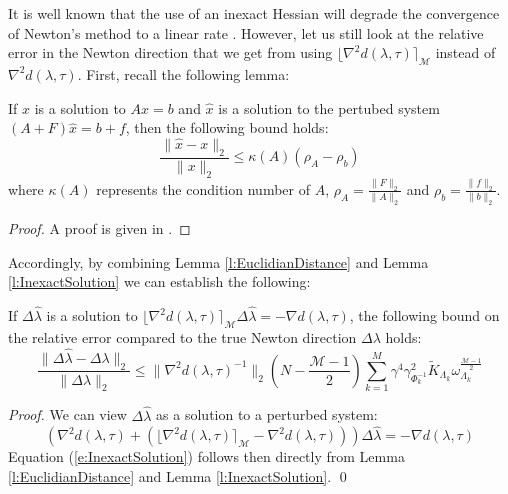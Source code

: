 It is well known that the use of an inexact Hessian will degrade the convergence of Newton's method to a linear rate \cite{}. However, let us still look at the relative error in the Newton direction that we get from using $\lfloor \nabla^2 d(\lambda, \tau) \rceil_{\mathcal{M}}$ instead of $\nabla^2 d(\lambda, \tau)$. First, recall the following lemma:
\begin{lemma} \label{l:InexactSolution}
If $x$ is a solution to $Ax = b$ and $\hat{x}$ is a solution to the pertubed system $(A + F) \hat{x} = b + f$, then the following bound holds:
\begin{equation}
\frac{\| \hat{x} - x \|_2}{\| x \|_2} \leq \kappa (A) (\rho_A - \rho_b)
\end{equation}
where $\kappa (A)$ represents the condition number of $A$, $\rho_A = \frac{\| F \|_2}{\| A \|_2}$ and $\rho_b = \frac{\| f \|_2}{\| b \|_2}$.
\end{lemma}
\begin{proof}
A proof is given in \cite{}.
\end{proof}

Accordingly, by combining Lemma \ref{l:EuclidianDistance} and Lemma \ref{l:InexactSolution} we can establish the following:
\begin{lemma}
If $\Delta \hat{\lambda}$ is a solution to $\lfloor \nabla^2 d(\lambda, \tau) \rceil_{\mathcal{M}} \Delta \hat{\lambda} = -\nabla d(\lambda,\tau)$, the following bound on the relative error compared to the true Newton direction $\Delta \lambda$ holds:
\begin{equation} \label{e:InexactSolution}
\frac{\| \Delta \hat{\lambda} - \Delta \lambda \|_2}{\| \Delta \lambda \|_2} \leq \| \nabla^2 d(\lambda,\tau)^{-1} \|_2 (N -\frac{\mathcal{M} - 1}{2}) \sum_{k=1}^M \gamma^4 \gamma_{\Phi_k^{-1}}^2 \tilde{K}_{\Lambda_k} \omega_{\Lambda_k}^{\frac{\mathcal{M} - 1}{2}}
\end{equation}
\end{lemma}
\begin{proof}
We can view $\Delta \hat{\lambda}$ as a solution to a perturbed system:
\begin{equation}
\left( \nabla^2 d(\lambda, \tau) + (\lfloor \nabla^2 d(\lambda, \tau) \rceil_{\mathcal{M}} - \nabla^2 d(\lambda, \tau)) \right) \Delta \hat{\lambda} = -\nabla d(\lambda, \tau)
\end{equation}
Equation (\ref{e:InexactSolution}) follows then directly from Lemma \ref{l:EuclidianDistance} and Lemma \ref{l:InexactSolution}.
\qed
\end{proof}

